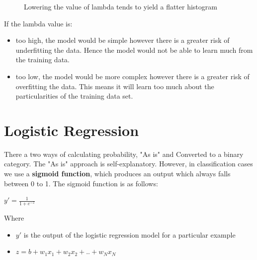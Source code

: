 \documentclass[12pt]{article}
\begin{document}
\begin{figure}[H]%
    \centering
    \qquad
    \caption{Lowering the value of lambda tends to yield a flatter histogram}%
\end{figure}
If the lambda value is:
\begin{itemize}
\item too high, the model would be simple however there is a greater risk of underfitting the data. Hence the model would not be able to learn much from the training data.
\item too low, the model would be more complex however there is a greater risk of overfitting the data. This means it will learn too much about the particularities of the training data set.
\end{itemize}

\section{Logistic Regression}
There a two ways of calculating probability, "As is" and Converted to a binary category. The "As is" approach is self-explanatory. However, in classification cases we use a \textbf{sigmoid function}, which produces an output which always falls between 0 to 1. The sigmoid function is as follows:
\begin{center}
\begin{LARGE}
$y' = \frac{1}{1 + e^{-z}}$
\end{LARGE}
\end{center}
Where 
\begin{itemize}
\item $y'$ is the output of the logistic regression model for a particular example
\item $z = b + w_1x_1 + w_2x_2 + .. + w_Nx_N$
\end{itemize}
\end{document}
